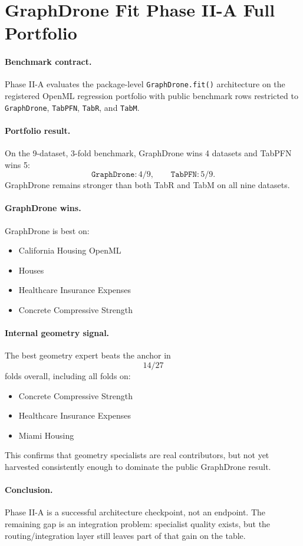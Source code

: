 \section{GraphDrone Fit Phase II-A Full Portfolio}

\paragraph{Benchmark contract.}
Phase II-A evaluates the package-level \texttt{GraphDrone.fit()} architecture on the registered OpenML regression portfolio with public benchmark rows restricted to
\texttt{GraphDrone}, \texttt{TabPFN}, \texttt{TabR}, and \texttt{TabM}.

\paragraph{Portfolio result.}
On the 9-dataset, 3-fold benchmark, GraphDrone wins 4 datasets and TabPFN wins 5:
\[
\texttt{GraphDrone}: 4/9,
\qquad
\texttt{TabPFN}: 5/9.
\]
GraphDrone remains stronger than both TabR and TabM on all nine datasets.

\paragraph{GraphDrone wins.}
GraphDrone is best on:
\begin{itemize}
\item California Housing OpenML
\item Houses
\item Healthcare Insurance Expenses
\item Concrete Compressive Strength
\end{itemize}

\paragraph{Internal geometry signal.}
The best geometry expert beats the anchor in
\[
14 / 27
\]
folds overall, including all folds on:
\begin{itemize}
\item Concrete Compressive Strength
\item Healthcare Insurance Expenses
\item Miami Housing
\end{itemize}
This confirms that geometry specialists are real contributors, but not yet harvested consistently enough to dominate the public GraphDrone result.

\paragraph{Conclusion.}
Phase II-A is a successful architecture checkpoint, not an endpoint.
The remaining gap is an integration problem:
specialist quality exists, but the routing/integration layer still leaves part of that gain on the table.
